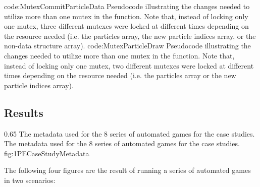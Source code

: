 \vspace{-0.5cm}
{code:MutexCommitParticleData}
{Pseudocode illustrating the changes needed to utilize more than one mutex in the  function. Note that, instead of locking only one mutex, three different mutexes were locked at different times depending on the resource needed (i.e. the particles array, the new particle indices array, or the non-data structure array).}
\vspace{-1.5cm}
{code:MutexParticleDraw}
{Pseudocode illustrating the changes needed to utilize more than one mutex in the  function. Note that, instead of locking only one mutex, two different mutexes were locked at different times depending on the resource needed (i.e. the particles array or the new particle indices array).}


\vspace{-0.5cm}
\subsection{Results}\label{ssec:studies_mutexes_results}

{0.65}
{The metadata used for the 8 series of automated games for the case studies.}
{The metadata used for the 8 series of automated games for the case studies.}
{fig:1PECaseStudyMetadata}

The following four figures are the result of running a series of automated games in two scenarios: 

